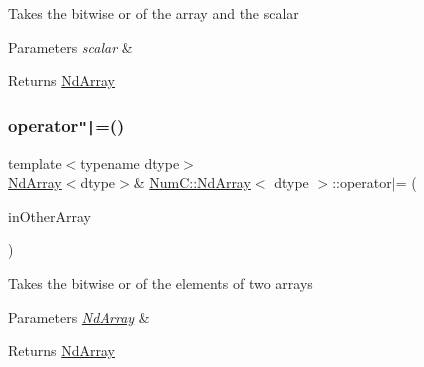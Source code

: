 Takes the bitwise or of the array and the scalar


\begin{DoxyParams}{Parameters}
{\em scalar} & \\
\hline
\end{DoxyParams}
\begin{DoxyReturn}{Returns}
\mbox{\hyperlink{class_num_c_1_1_nd_array}{Nd\+Array}} 
\end{DoxyReturn}
\mbox{\label{class_num_c_1_1_nd_array_a406a8df3406d584a30433405785bdd1f}} 
\subsubsection{\texorpdfstring{operator\texttt{"|}=()}{operator|=()}\hspace{0.1cm}{\footnotesize\ttfamily [1/2]}}
{\footnotesize\ttfamily template$<$typename dtype$>$ \\
\mbox{\hyperlink{class_num_c_1_1_nd_array}{Nd\+Array}}$<$dtype$>$\& \mbox{\hyperlink{class_num_c_1_1_nd_array}{Num\+C\+::\+Nd\+Array}}$<$ dtype $>$\+::operator$\vert$= (\begin{DoxyParamCaption}\item[{const \mbox{\hyperlink{class_num_c_1_1_nd_array}{Nd\+Array}}$<$ dtype $>$ \&}]{in\+Other\+Array }\end{DoxyParamCaption})\hspace{0.3cm}{\ttfamily [inline]}}

Takes the bitwise or of the elements of two arrays


\begin{DoxyParams}{Parameters}
{\em \mbox{\hyperlink{class_num_c_1_1_nd_array}{Nd\+Array}}} & \\
\hline
\end{DoxyParams}
\begin{DoxyReturn}{Returns}
\mbox{\hyperlink{class_num_c_1_1_nd_array}{Nd\+Array}} 
\end{DoxyReturn}
\mbox{\label{class_num_c_1_1_nd_array_a8b5adc0e2a4dc3b86a31103bc74810df}} 
